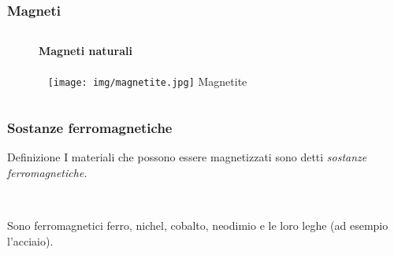 \documentclass[]{beamer}
\theoremstyle{plain}
\begin{document}
\begin{frame}
\frametitle{Magneti}
\begin{columns}
\begin{column}{0.4\textwidth}
\begin{figure}
\textbf{Magneti naturali}\\~\\~
\texttt{[image: img/magnetite.jpg]}
Magnetite
\end{figure}
\end{column}
\begin{column}{0.4\textwidth}
\end{column}
\end{columns}
\end{frame}

\begin{frame}
\frametitle{Sostanze ferromagnetiche}
\begin{block}{Definizione}
I materiali che possono essere magnetizzati sono detti \emph{sostanze ferromagnetiche.}
\end{block}\pause

~

Sono ferromagnetici ferro, nichel, cobalto, neodimio e le loro leghe (ad esempio l'acciaio).
\end{frame}
\end{document}
